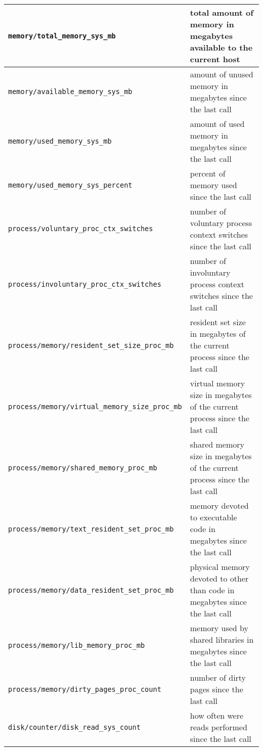 \begin{tabularx}{\linewidth}{ |p{8cm}|p{6cm}| }
    \hline
    \texttt{memory/total\_memory\_sys\_mb}                  & total amount of memory in megabytes available to the current host           \\
    \hline
    \texttt{memory/available\_memory\_sys\_mb}              & amount of unused memory in megabytes since the last call                    \\
    \hline
    \texttt{memory/used\_memory\_sys\_mb}                   & amount of used memory in megabytes since the last call                      \\
    \hline
    \texttt{memory/used\_memory\_sys\_percent}              & percent of memory used since the last call                                  \\
    \hline
    \texttt{process/voluntary\_proc\_ctx\_switches}         & number of voluntary process context switches since the last call            \\
    \hline
    \texttt{process/involuntary\_proc\_ctx\_switches}       & number of involuntary process context switches since the last call          \\
    \hline
    \texttt{process/memory/resident\_set\_size\_proc\_mb}   & resident set size in megabytes of the current process since the last call   \\
    \hline
    \texttt{process/memory/virtual\_memory\_size\_proc\_mb} & virtual memory size in megabytes of the current process since the last call \\
    \hline
    \texttt{process/memory/shared\_memory\_proc\_mb}        & shared memory size in megabytes of the current process since the last call  \\
    \hline
    \texttt{process/memory/text\_resident\_set\_proc\_mb}   & memory devoted to executable code in megabytes since the last call          \\
    \hline
    \texttt{process/memory/data\_resident\_set\_proc\_mb}   & physical memory devoted to other than code in megabytes since the last call \\
    \hline
    \texttt{process/memory/lib\_memory\_proc\_mb}           & memory used by shared libraries in megabytes since the last call            \\
    \hline
    \texttt{process/memory/dirty\_pages\_proc\_count}       & number of dirty pages since the last call                                   \\
    \hline
    \texttt{disk/counter/disk\_read\_sys\_count}            & how often were reads performed since the last call                          \\

\end{tabularx}
